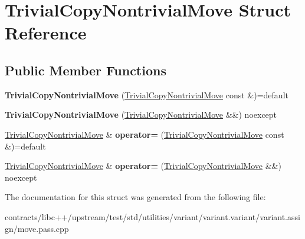 \hypertarget{struct_trivial_copy_nontrivial_move}{}\section{Trivial\+Copy\+Nontrivial\+Move Struct Reference}
\label{struct_trivial_copy_nontrivial_move}
\subsection*{Public Member Functions}
\begin{DoxyCompactItemize}
\item 
\mbox{\label{struct_trivial_copy_nontrivial_move_a6bc9656aa396b06d32a6bd7b3845adc0}} 
{\bfseries Trivial\+Copy\+Nontrivial\+Move} (\mbox{\hyperlink{struct_trivial_copy_nontrivial_move}{Trivial\+Copy\+Nontrivial\+Move}} const \&)=default
\item 
\mbox{\label{struct_trivial_copy_nontrivial_move_a65b58237b576f6c98b2cbc015fcc3917}} 
{\bfseries Trivial\+Copy\+Nontrivial\+Move} (\mbox{\hyperlink{struct_trivial_copy_nontrivial_move}{Trivial\+Copy\+Nontrivial\+Move}} \&\&) noexcept
\item 
\mbox{\label{struct_trivial_copy_nontrivial_move_aff7ff9b062b72d95db3d33b624018ecd}} 
\mbox{\hyperlink{struct_trivial_copy_nontrivial_move}{Trivial\+Copy\+Nontrivial\+Move}} \& {\bfseries operator=} (\mbox{\hyperlink{struct_trivial_copy_nontrivial_move}{Trivial\+Copy\+Nontrivial\+Move}} const \&)=default
\item 
\mbox{\label{struct_trivial_copy_nontrivial_move_aa16e4425235a114c060b58dce7687d2a}} 
\mbox{\hyperlink{struct_trivial_copy_nontrivial_move}{Trivial\+Copy\+Nontrivial\+Move}} \& {\bfseries operator=} (\mbox{\hyperlink{struct_trivial_copy_nontrivial_move}{Trivial\+Copy\+Nontrivial\+Move}} \&\&) noexcept
\end{DoxyCompactItemize}


The documentation for this struct was generated from the following file\+:\begin{DoxyCompactItemize}
\item 
contracts/libc++/upstream/test/std/utilities/variant/variant.\+variant/variant.\+assign/move.\+pass.\+cpp\end{DoxyCompactItemize}
